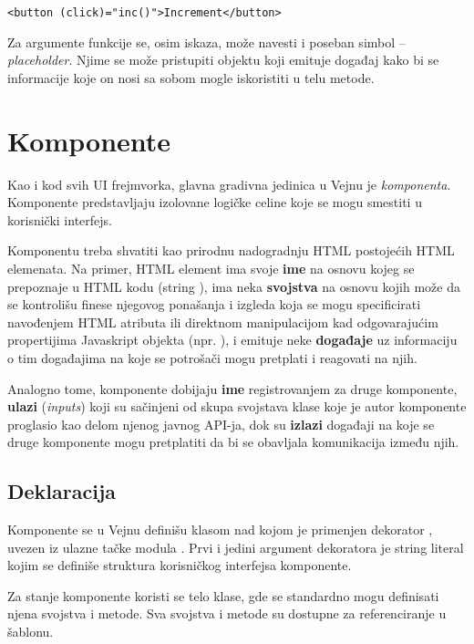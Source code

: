 \begin{verbatim}
<button (click)="inc()">Increment</button>
\end{verbatim}

Za argumente funkcije se, osim iskaza, može navesti i poseban simbol \code{\#} -- \textsl{placeholder}.
Njime se može pristupiti objektu koji emituje događaj kako bi se informacije koje on nosi sa sobom mogle iskoristiti u telu metode.

\section{Komponente}

Kao i kod svih UI frejmvorka, glavna gradivna jedinica u Vejnu je \emph{komponenta}.
Komponente predstavljaju izolovane logičke celine koje se mogu smestiti u korisnički interfejs.

Komponentu treba shvatiti kao prirodnu nadogradnju HTML postojećih HTML elemenata.
Na primer, HTML element  ima svoje \textbf{ime} na osnovu kojeg se prepoznaje u HTML kodu (string ), ima neka \textbf{svojstva} na osnovu kojih može da se kontrolišu finese njegovog ponašanja i izgleda koja se mogu specificirati navođenjem HTML atributa ili direktnom manipulacijom kad odgovarajućim propertijima Javaskript objekta (npr. ), i emituje neke \textbf{događaje} uz informaciju o tim događajima na koje se potrošači mogu pretplati i reagovati na njih.

Analogno tome, komponente dobijaju \textbf{ime} registrovanjem za druge komponente, \textbf{ulazi} (\textsl{inputs}) koji su sačinjeni od skupa svojstava klase koje je autor komponente proglasio kao delom njenog javnog API-ja, dok su \textbf{izlazi} događaji na koje se druge komponente mogu pretplatiti da bi se obavljala komunikacija između njih.

\subsection{Deklaracija}

Komponente se u Vejnu definišu klasom nad kojom je primenjen dekorator , uvezen iz ulazne tačke modula .
Prvi i jedini argument dekoratora je string literal kojim se definiše struktura korisničkog interfejsa komponente.

Za stanje komponente koristi se telo klase, gde se standardno mogu definisati njena svojstva i metode.
Sva svojstva i metode su dostupne za referenciranje u šablonu.

